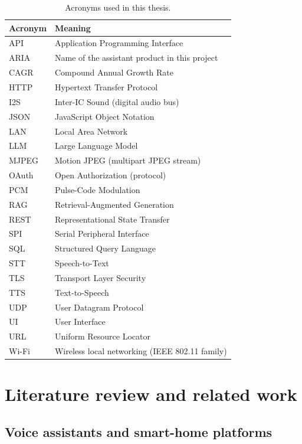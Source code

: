 \documentclass[12pt,a4paper]{report}
\begin{document}
\begin{table}[htbp]
\centering
\caption{Acronyms used in this thesis.}
\label{tab:acronyms}
\begin{tabular}{@{}ll@{}}
\toprule
\textbf{Acronym} & \textbf{Meaning} \\
\midrule
API & Application Programming Interface \\
ARIA & Name of the assistant product in this project \\
CAGR & Compound Annual Growth Rate \\
HTTP & Hypertext Transfer Protocol \\
I2S & Inter-IC Sound (digital audio bus) \\
JSON & JavaScript Object Notation \\
LAN & Local Area Network \\
LLM & Large Language Model \\
MJPEG & Motion JPEG (multipart JPEG stream) \\
OAuth & Open Authorization (protocol) \\
PCM & Pulse-Code Modulation \\
RAG & Retrieval-Augmented Generation \\
REST & Representational State Transfer \\
SPI & Serial Peripheral Interface \\
SQL & Structured Query Language \\
STT & Speech-to-Text \\
TLS & Transport Layer Security \\
TTS & Text-to-Speech \\
UDP & User Datagram Protocol \\
UI & User Interface \\
URL & Uniform Resource Locator \\
Wi-Fi & Wireless local networking (IEEE 802.11 family) \\
\bottomrule
\end{tabular}
\end{table}

\chapter{Literature review and related work}

\section{Voice assistants and smart-home platforms}
\end{document}
